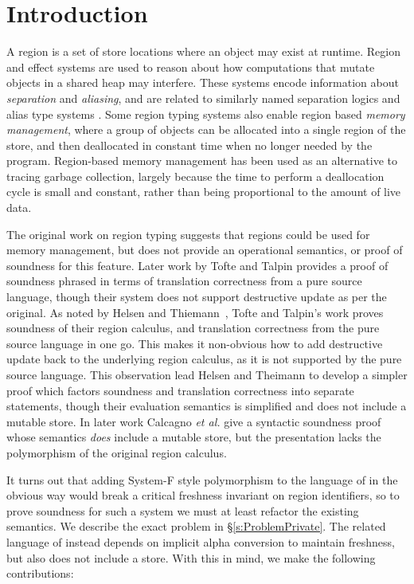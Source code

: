 \section{Introduction}
\label{s:Introduction}

A region is a set of store locations where an object may exist at runtime. Region and effect systems \cite{Lucassen:polymorphic-effects} are used to reason about how computations that mutate objects in a shared heap may interfere. These systems encode information about \emph{separation} and \emph{aliasing}, and are related to similarly named separation logics \cite{Reynolds:separation-logic} and alias type systems \cite{Smith:alias-types}. Some region typing systems also enable region based \emph{memory management}, where a group of objects can be allocated into a single region of the store, and then deallocated in constant time when no longer needed by the program. Region-based memory management has been used as an alternative to tracing garbage collection, largely because the time to perform a deallocation cycle is small and constant, rather than being proportional to the amount of live data.

The original work on region typing \cite{Lucassen:types-and-effects} suggests that regions could be used for memory management, but does not provide an operational semantics, or proof of soundness for this feature. Later work by Tofte and Talpin  provides a proof of soundness phrased in terms of translation correctness from a pure source language, though their system does not support destructive update as per the original. As noted by Helsen and Thiemann~, Tofte and Talpin's work proves soundness of their region calculus, and translation correctness from the pure source language in one go. This makes it non-obvious how to add destructive update back to the underlying region calculus, as it is not supported by the pure source language. This observation lead Helsen and Theimann to develop a simpler proof which factors soundness and translation correctness into separate statements, though their evaluation semantics is simplified and does not include a mutable store. In later work Calcagno \emph{et al.}  give a syntactic soundness proof whose semantics \emph{does} include a mutable store, but the presentation lacks the polymorphism of the original region calculus. 

It turns out that adding System-F style polymorphism to the language of \cite{Calcagno:soundness-results} in the obvious way would break a critical freshness invariant on region identifiers, so to prove soundness for such a system we must at least refactor the existing semantics. We describe the exact problem in \S\ref{s:ProblemPrivate}. The related language of \cite{Henglein:effect-types} instead depends on implicit alpha conversion to maintain freshness, but also does not include a store. With this in mind, we make the following contributions:

